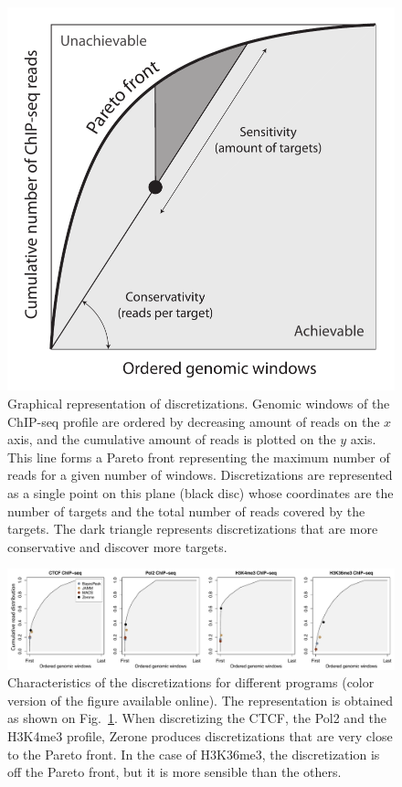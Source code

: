 \documentclass{bioinfo}
\begin{document}
\begin{figure}[!tpb]
\centerline{\includegraphics[scale=0.5]{pareto_front_explanation.pdf}}
\caption{
  Graphical representation of discretizations. Genomic
  windows of the ChIP-seq profile are ordered by decreasing amount of
  reads on the $x$ axis, and the cumulative amount of reads is plotted
  on the $y$ axis. This line forms a Pareto front representing the
  maximum number of reads for a given number of windows. Discretizations
  are represented as a single point on this plane (black disc) whose
  coordinates are the number of targets and the total number of reads
  covered by the targets. The dark triangle represents discretizations
  that are more conservative and discover more targets.
}
\label{fig:expl}
\end{figure}

\begin{figure}[!tbp]
\centerline{\includegraphics[scale=0.4]{pareto_front.pdf}}
\caption{
  Characteristics of the discretizations for different programs
  (color version of the figure available online).
  The representation is obtained as shown on Fig.~\ref{fig:expl}.
  When discretizing the CTCF, the Pol2 and the H3K4me3 profile,
  Zerone produces discretizations that are very close to the Pareto
  front. In the case of H3K36me3, the discretization is off the
  Pareto front, but it is more sensible than the others.
}
\label{fig:pareto}
\end{figure}
\end{document}
